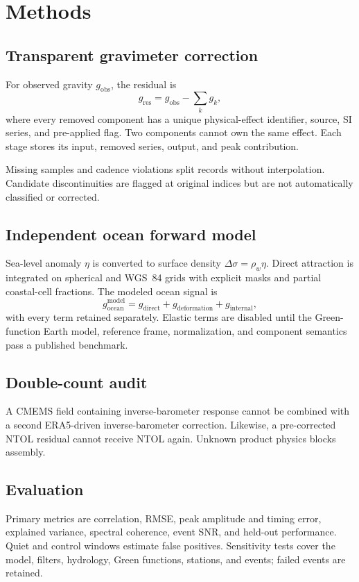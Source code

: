 \documentclass[11pt]{article}
\begin{document}
\section{Methods}
\subsection{Transparent gravimeter correction}
For observed gravity $g_{\mathrm{obs}}$, the residual is
\begin{equation}
 g_{\mathrm{res}} = g_{\mathrm{obs}}-
 \sum_k g_k,
\end{equation}
where every removed component has a unique physical-effect identifier, source,
SI series, and pre-applied flag. Two components cannot own the same effect. Each
stage stores its input, removed series, output, and peak contribution.

Missing samples and cadence violations split records without interpolation.
Candidate discontinuities are flagged at original indices but are not
automatically classified or corrected.

\subsection{Independent ocean forward model}
Sea-level anomaly $\eta$ is converted to surface density
$\Delta\sigma=\rho_w\eta$. Direct attraction is integrated on spherical and
WGS~84 grids with explicit masks and partial coastal-cell fractions. The modeled
ocean signal is
\begin{equation}
 g_{\mathrm{ocean}}^{\mathrm{model}}=
 g_{\mathrm{direct}}+g_{\mathrm{deformation}}+g_{\mathrm{internal}},
\end{equation}
with every term retained separately. Elastic terms are disabled until the
Green-function Earth model, reference frame, normalization, and component
semantics pass a published benchmark.

\subsection{Double-count audit}
A CMEMS field containing inverse-barometer response cannot be combined with a
second ERA5-driven inverse-barometer correction. Likewise, a pre-corrected NTOL
residual cannot receive NTOL again. Unknown product physics blocks assembly.

\subsection{Evaluation}
Primary metrics are correlation, RMSE, peak amplitude and timing error,
explained variance, spectral coherence, event SNR, and held-out performance.
Quiet and control windows estimate false positives. Sensitivity tests cover the
model, filters, hydrology, Green functions, stations, and events; failed events
are retained.
\end{document}
